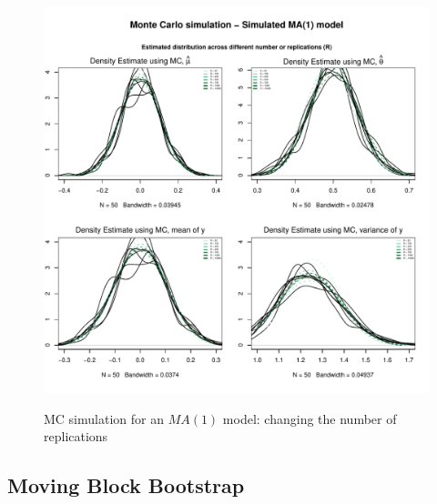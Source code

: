 \documentclass{article}
\begin{document}
\begin{figure}[hbt!]
\includegraphics[width=\textwidth]{plots/MC_MA1_densities_diff_norepl}
\label{fig:MC_MA1_densities_diff_norepl}
\caption{MC simulation for an $MA(1)$ model: changing the number of replications}
\centering
\end{figure}



\clearpage
\subsection{Moving Block Bootstrap}
\end{document}
